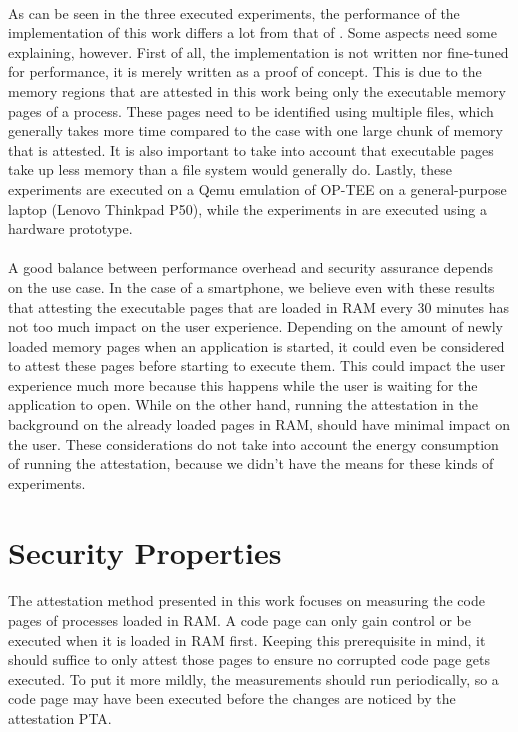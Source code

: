 \paragraph*{}
As can be seen in the three executed experiments, the performance of the implementation of this work differs a lot from that of \cite{LingZhen2021Sbtb}. Some aspects need some explaining, however. First of all, the implementation is not written nor fine-tuned for performance, it is merely written as a proof of concept. This is due to the memory regions that are attested in this work being only the executable memory pages of a process. These pages need to be identified using multiple files, which generally takes more time compared to the case with one large chunk of memory that is attested. It is also important to take into account that executable pages take up less memory than a file system would generally do. Lastly, these experiments are executed on a Qemu emulation of OP-TEE on a general-purpose laptop (Lenovo Thinkpad P50), while the experiments in \cite{LingZhen2021Sbtb} are executed using a hardware prototype. 

\paragraph*{}
A good balance between performance overhead and security assurance depends on the use case. In the case of a smartphone, we believe even with these results that attesting the executable pages that are loaded in RAM every 30 minutes has not too much impact on the user experience. Depending on the amount of newly loaded memory pages when an application is started, it could even be considered to attest these pages before starting to execute them. This could impact the user experience much more because this happens while the user is waiting for the application to open. While on the other hand, running the attestation in the background on the already loaded pages in RAM, should have minimal impact on the user. These considerations do not take into account the energy consumption of running the attestation, because we didn't have the means for these kinds of experiments.

\section{Security Properties}

\paragraph*{}
The attestation method presented in this work focuses on measuring the code pages of processes loaded in RAM. A code page can only gain control or be executed when it is loaded in RAM first. Keeping this prerequisite in mind, it should suffice to only attest those pages to ensure no corrupted code page gets executed. To put it more mildly, the measurements should run periodically, so a code page may have been executed before the changes are noticed by the attestation PTA.

